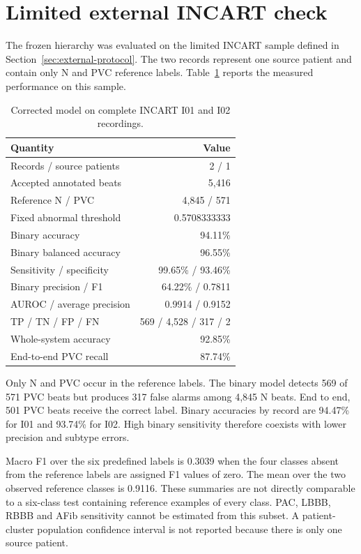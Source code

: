 \section{Limited external INCART check}\label{sec:external-incart}

The frozen hierarchy was evaluated on the limited INCART sample defined in
Section~\ref{sec:external-protocol}. The two records represent one source
patient and contain only N and PVC reference labels. Table~\ref{tab:external-incart-summary}
reports the measured performance on this sample.

\begin{table}[H]
\centering
\caption{Corrected model on complete INCART I01 and I02 recordings.}
\label{tab:external-incart-summary}
\begin{tabular}{lr}
\toprule
Quantity & Value\\
\midrule
Records / source patients & 2 / 1\\
Accepted annotated beats & 5,416\\
Reference N / PVC & 4,845 / 571\\
Fixed abnormal threshold & 0.5708333333\\
Binary accuracy & 94.11\%\\
Binary balanced accuracy & 96.55\%\\
Sensitivity / specificity & 99.65\% / 93.46\%\\
Binary precision / F1 & 64.22\% / 0.7811\\
AUROC / average precision & 0.9914 / 0.9152\\
TP / TN / FP / FN & 569 / 4,528 / 317 / 2\\
Whole-system accuracy & 92.85\%\\
End-to-end PVC recall & 87.74\%\\
\bottomrule
\end{tabular}
\end{table}

Only N and PVC occur in the reference labels. The binary model detects 569 of 571
PVC beats but produces 317 false alarms among 4,845 N beats. End to end,
501 PVC beats receive the correct label. Binary accuracies by record are
94.47\% for I01 and 93.74\% for I02. High binary sensitivity therefore
coexists with lower precision and subtype errors.

Macro F1 over the six predefined labels is 0.3039 when the four classes
absent from the reference labels are assigned F1 values of zero. The mean over the two observed reference
classes is 0.9116. These summaries are not directly comparable to a six-class
test containing reference examples of every class. PAC, LBBB, RBBB and AFib sensitivity cannot
be estimated from this subset. A patient-cluster population confidence
interval is not reported because there is only one source patient.
